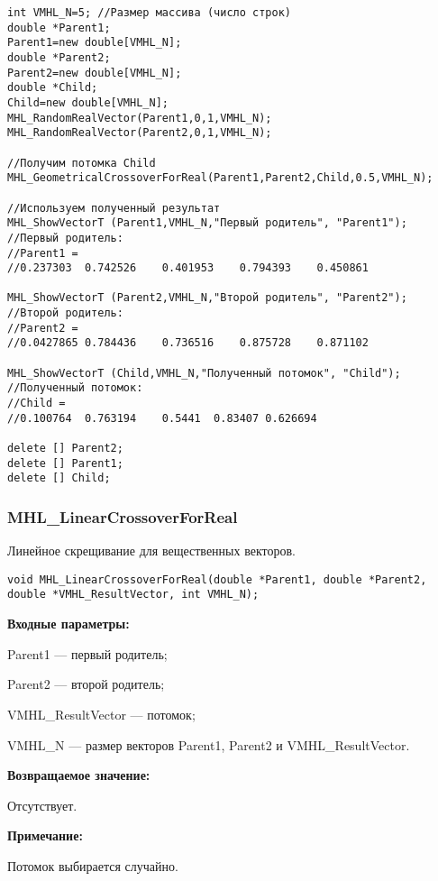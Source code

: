 \documentclass[a4paper,12pt]{article}
\begin{document}
\begin{lstlisting}[label=code_use_MHL_GeometricalCrossoverForReal,caption=Пример использования]
int VMHL_N=5; //Размер массива (число строк)
double *Parent1;
Parent1=new double[VMHL_N];
double *Parent2;
Parent2=new double[VMHL_N];
double *Child;
Child=new double[VMHL_N];
MHL_RandomRealVector(Parent1,0,1,VMHL_N);
MHL_RandomRealVector(Parent2,0,1,VMHL_N);

//Получим потомка Child
MHL_GeometricalCrossoverForReal(Parent1,Parent2,Child,0.5,VMHL_N);

//Используем полученный результат
MHL_ShowVectorT (Parent1,VMHL_N,"Первый родитель", "Parent1");
//Первый родитель:
//Parent1 =
//0.237303	0.742526	0.401953	0.794393	0.450861

MHL_ShowVectorT (Parent2,VMHL_N,"Второй родитель", "Parent2");
//Второй родитель:
//Parent2 =
//0.0427865	0.784436	0.736516	0.875728	0.871102

MHL_ShowVectorT (Child,VMHL_N,"Полученный потомок", "Child");
//Полученный потомок:
//Child =
//0.100764	0.763194	0.5441	0.83407	0.626694

delete [] Parent2;
delete [] Parent1;
delete [] Child;
\end{lstlisting}

\subsubsection{MHL\_LinearCrossoverForReal}\label{MHL_LinearCrossoverForReal}

Линейное скрещивание для вещественных векторов.


\begin{lstlisting}[label=code_syntax_MHL_LinearCrossoverForReal,caption=Синтаксис]
void MHL_LinearCrossoverForReal(double *Parent1, double *Parent2, double *VMHL_ResultVector, int VMHL_N);
\end{lstlisting}

\textbf{Входные параметры:}
 
Parent1 --- первый родитель;
 
Parent2 --- второй родитель;
 
VMHL\_ResultVector --- потомок;
 
VMHL\_N --- размер векторов Parent1, Parent2 и VMHL\_ResultVector.

\textbf{Возвращаемое значение:}

 Отсутствует.
 
\textbf{ Примечание:}

 Потомок выбирается случайно.
 
\end{document}
